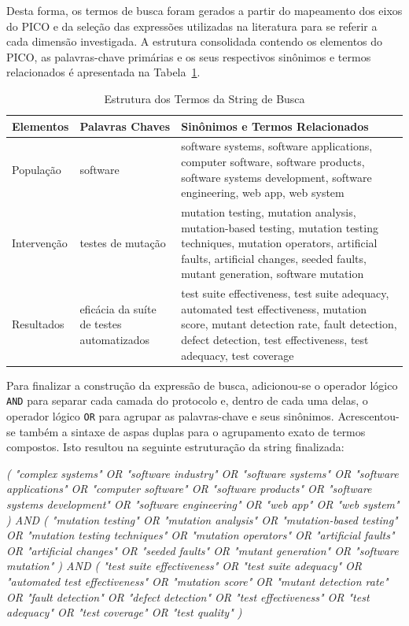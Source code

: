 Desta forma, os termos de busca foram gerados a partir do mapeamento dos eixos do PICO e da seleção das expressões utilizadas na literatura para se referir a cada dimensão investigada. A estrutura consolidada contendo os elementos do PICO, as palavras-chave primárias e os seus respectivos sinônimos e termos relacionados é apresentada na Tabela~\ref{tab:termos-string-busca}.

\begin{table}[htb]
    \centering
    \caption{Estrutura dos Termos da String de Busca}
    \label{tab:termos-string-busca}
    \begin{tabularx}{0.95\textwidth}{|l|p{3.8cm}|X|}
        \hline
        \textbf{Elementos} & \textbf{Palavras Chaves} & \textbf{Sinônimos e Termos Relacionados} \\ \hline
        População & software & software systems, software applications, computer software, software products, software systems development, software engineering, web app, web system \\ \hline
        Intervenção & testes de mutação & mutation testing, mutation analysis, mutation-based testing, mutation testing techniques, mutation operators, artificial faults, artificial changes, seeded faults, mutant generation, software mutation \\ \hline
        Resultados & eficácia da suíte de testes automatizados & test suite effectiveness, test suite adequacy, automated test effectiveness, mutation score, mutant detection rate, fault detection, defect detection, test effectiveness, test adequacy, test coverage \\ \hline
    \end{tabularx}
\end{table}

Para finalizar a construção da expressão de busca, adicionou-se o operador lógico \texttt{AND} para separar cada camada do protocolo e, dentro de cada uma delas, o operador lógico \texttt{OR} para agrupar as palavras-chave e seus sinônimos. Acrescentou-se também a sintaxe de aspas duplas para o agrupamento exato de termos compostos. Isto resultou na seguinte estruturação da string finalizada:


\vspace{0.3cm}
\noindent\textit{( "complex systems" OR "software industry" OR "software systems" OR "software applications" OR "computer software" OR "software products" OR "software systems development" OR "software engineering" OR "web app" OR "web system" ) AND ( "mutation testing" OR "mutation analysis" OR "mutation-based testing" OR "mutation testing techniques" OR "mutation operators" OR "artificial faults" OR "artificial changes" OR "seeded faults" OR "mutant generation" OR "software mutation" ) AND ( "test suite effectiveness" OR "test suite adequacy" OR "automated test effectiveness" OR "mutation score" OR "mutant detection rate" OR "fault detection" OR "defect detection" OR "test effectiveness" OR "test adequacy" OR "test coverage" OR "test quality" )}
\vspace{0.3cm}

